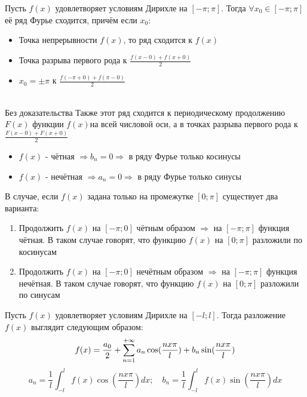 \begin{Th}
	Пусть $f(x)$ удовлетворяет условиям Дирихле на $[-\pi;\pi]$. Тогда $\forall x_0 \in [-\pi;\pi]$ её ряд Фурье сходится, причём если $x_0$:
	\begin{itemize}
		\item Точка непрерывности $f(x)$, то ряд сходится к $f(x)$
		\item Точка разрыва первого рода к $\frac{f(x-0) + f(x+0)}{2}$
		\item $x_0 = \pm\pi$ к $\frac{f(-\pi+0) + f(\pi-0)}{2}$
	\end{itemize}
	~\\
	Без доказательства
	Также этот ряд сходится к периодическому продолжению $F(x)$ функции $f(x)$на всей числовой оси, а в точках разрыва первого рода к $\frac{F(x-0) + F(x+0)}{2}$
\end{Th}

\begin{Note}
	\begin{itemize}
		\item $f(x)$ - чётная $\Rightarrow b_n = 0 \Rightarrow$ в ряду Фурье только косинусы
		\item $f(x)$ - нечётная $\Rightarrow a_n = 0 \Rightarrow$ в ряду Фурье только синусы
	\end{itemize}
\end{Note}

\begin{Note}
	В случае, если $f(x)$ задана только на промежутке $[0; \pi]$ существует два варианта:
	\begin{enumerate}
		\item Продолжить $f(x)$ на $[-\pi; 0]$ чётным образом $\Rightarrow$ на $[-\pi;\pi]$ функция чётная. В таком случае говорят, что функцию $f(x)$ на $[0;\pi]$ разложили по косинусам
		\item Продолжить $f(x)$ на $[-\pi; 0]$ нечётным образом $\Rightarrow$ на $[-\pi;\pi]$ функция нечётная. В таком случае говорят, что функцию $f(x)$ на $[0;\pi]$ разложили по синусам
	\end{enumerate}
\end{Note}

\begin{Note}
	Пусть $f(x)$ удовлетворяет условиям Дирихле на $[-l;l]$. Тогда разложение $f(x)$ выглядит следующим образом:
	$$
	f(x) = \frac{a_0}{2} + \sum\limits_{n = 1}^{+\infty}{a_n\cos(\frac{nx\pi}{l}) + b_n\sin(\frac{nx\pi}{l})}
	$$
	$$
	a_n = \frac{1}{l}\int_{-l}^{l}f(x)\cos(\frac{nx\pi}{l})dx; \quad b_n = \frac{1}{l}\int_{-l}^{l}f(x)\sin(\frac{nx\pi}{l})dx
	$$
\end{Note}

